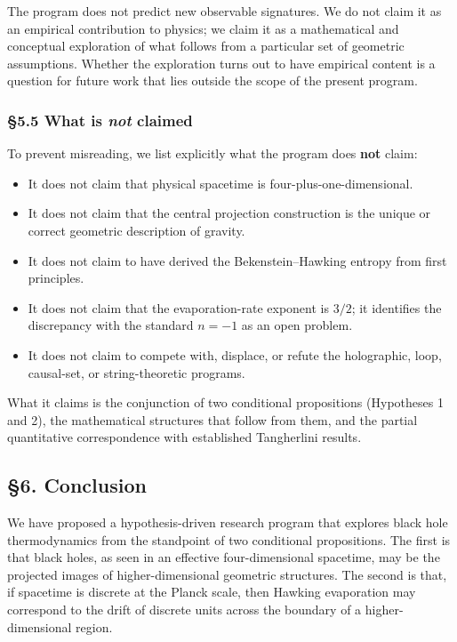 \documentclass[a4paper,11pt]{article}
\theoremstyle{definition}
\providecommand{\tightlist}{\setlength{\itemsep}{0pt}\setlength{\parskip}{0pt}}
\begin{document}
The program does not predict new observable signatures. We do not claim
it as an empirical contribution to physics; we claim it as a
mathematical and conceptual exploration of what follows from a
particular set of geometric assumptions. Whether the exploration turns
out to have empirical content is a question for future work that lies
outside the scope of the present program.

\subsubsection{\texorpdfstring{§5.5 What is \emph{not}
claimed}{§5.5 What is not claimed}}\label{what-is-not-claimed}

To prevent misreading, we list explicitly what the program does
\textbf{not} claim:

\begin{itemize}
\tightlist
\item
  It does not claim that physical spacetime is
  four-plus-one-dimensional.
\item
  It does not claim that the central projection construction is the
  unique or correct geometric description of gravity.
\item
  It does not claim to have derived the Bekenstein--Hawking entropy from
  first principles.
\item
  It does not claim that the evaporation-rate exponent is \(3/2\); it
  identifies the discrepancy with the standard \(n = -1\) as an open
  problem.
\item
  It does not claim to compete with, displace, or refute the
  holographic, loop, causal-set, or string-theoretic programs.
\end{itemize}

What it claims is the conjunction of two conditional propositions
(Hypotheses 1 and 2), the mathematical structures that follow from them,
and the partial quantitative correspondence with established Tangherlini
results.

\subsection{§6. Conclusion}\label{conclusion}

We have proposed a hypothesis-driven research program that explores
black hole thermodynamics from the standpoint of two conditional
propositions. The first is that black holes, as seen in an effective
four-dimensional spacetime, may be the projected images of
higher-dimensional geometric structures. The second is that, if
spacetime is discrete at the Planck scale, then Hawking evaporation may
correspond to the drift of discrete units across the boundary of a
higher-dimensional region.
\end{document}
